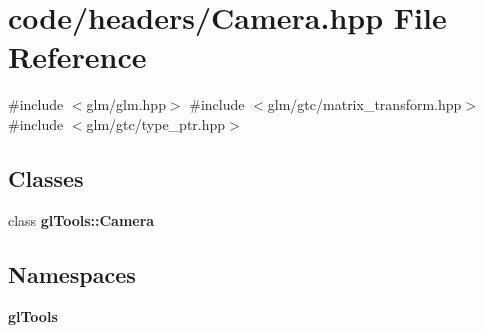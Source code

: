 \section{code/headers/\+Camera.hpp File Reference}
\label{_camera_8hpp}
{\ttfamily \#include $<$glm/glm.\+hpp$>$}\newline
{\ttfamily \#include $<$glm/gtc/matrix\+\_\+transform.\+hpp$>$}\newline
{\ttfamily \#include $<$glm/gtc/type\+\_\+ptr.\+hpp$>$}\newline
\subsection*{Classes}
\begin{DoxyCompactItemize}
\item 
class \textbf{ gl\+Tools\+::\+Camera}
\end{DoxyCompactItemize}
\subsection*{Namespaces}
\begin{DoxyCompactItemize}
\item 
 \textbf{ gl\+Tools}
\end{DoxyCompactItemize}
